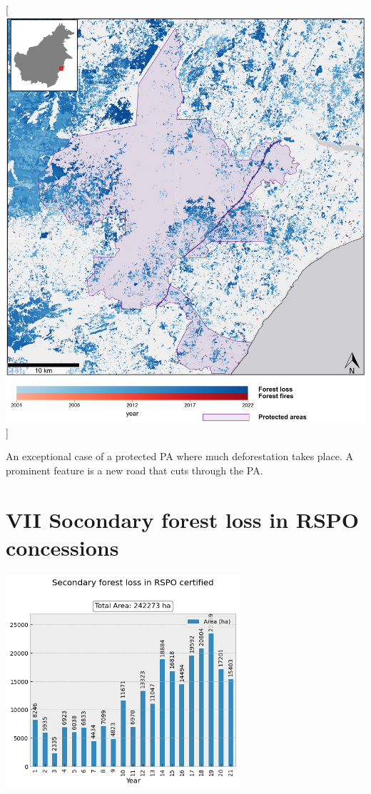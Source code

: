 \documentclass[
  letterpaper,
  DIV=11,
  numbers=noendperiod]{scrreprt}
\begin{document}
{[}\includegraphics[width=1\textwidth,height=\textheight]{text/../code/results/maps/deforestation_protected_areas_other.png}{]}
\normalcolor

An exceptional case of a protected PA where much deforestation takes
place. A prominent feature is a new road that cuts through the PA.
\newpage

\hypertarget{socondary-forest-loss-in-rspo-concessions}{%
\section*{\texorpdfstring{\textsc{VII} Socondary forest loss in RSPO
concessions}{ Socondary forest loss in RSPO concessions}}\label{socondary-forest-loss-in-rspo-concessions}}


\color{white}

\includegraphics[width=0.65\textwidth,height=\textheight]{text/../code/results/plots/RSPO_secondary_forest_loss.png}
\end{document}

